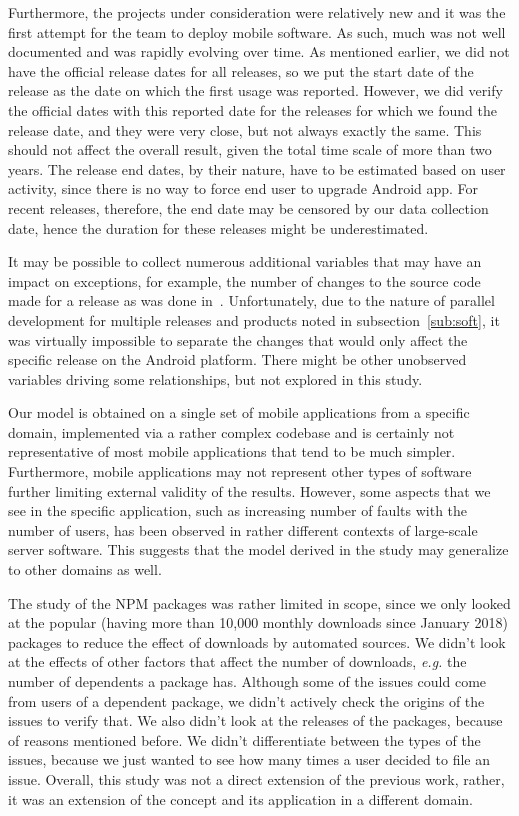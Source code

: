 \documentclass[smallextended]{svjour3}       %
\begin{document}
Furthermore, the projects under consideration were relatively new and
it was the first attempt for the team to deploy mobile software. As
such, much was not well documented and was rapidly
evolving over time. As mentioned earlier, we did not have the official release
dates for all releases, so we put the start date of the release as
the date on which the first usage was reported. However, we did
verify the official dates with this reported date for the releases
for which we found the release date, and they were very close, but
not always exactly the same. This should not affect
the overall result, given the total time scale of more than two
years. The release end dates, by their nature, have to be estimated 
based on user activity, since there is no way to force end user
to upgrade Android app. For recent releases, therefore, the end date 
may be censored by our data
collection date, hence the duration for these releases might be
underestimated. 

It may be possible to collect numerous additional variables that may
have an impact on exceptions, for example, the number of changes to
the source code made for a release as was done
in~\cite{IQ08}. Unfortunately, due to the nature of parallel
development for multiple releases and products noted in
subsection~\ref{sub:soft}, it was virtually impossible to separate
the changes that would only affect the specific release on the Android
platform. There might be other unobserved variables driving some
relationships, but not explored in this study. 

Our model is obtained on a single set of mobile applications 
from a specific domain, implemented via
a rather complex codebase and is certainly not representative of
most mobile applications that tend to be much simpler. Furthermore,
mobile applications  
may not represent other types of software further limiting external
validity of the results. However, some aspects that we see in the
specific application, such as increasing number of faults with the
number of users, has been observed in rather different contexts of
large-scale server software. This suggests that the model derived in
the study may generalize to other domains as well. 

The study of the NPM packages was rather limited in scope, since we
only looked at the popular (having more than 10,000 monthly downloads 
since January 2018) packages to reduce the effect of downloads by 
automated sources. We didn't look at the effects of other factors 
that affect the number of downloads, \emph{e.g.} the number of 
dependents a package has. Although some of the issues could come 
from users of a dependent package, we didn't actively check the
origins of the issues to verify that. We also didn't look at the
releases of the packages, because of reasons mentioned before.
We didn't differentiate between the types of the issues, because we 
just wanted to see how many times a user decided to file an issue.
Overall, this study was not a direct extension of the previous work,
rather, it was an extension of the concept and its application in a different domain.
\end{document}
